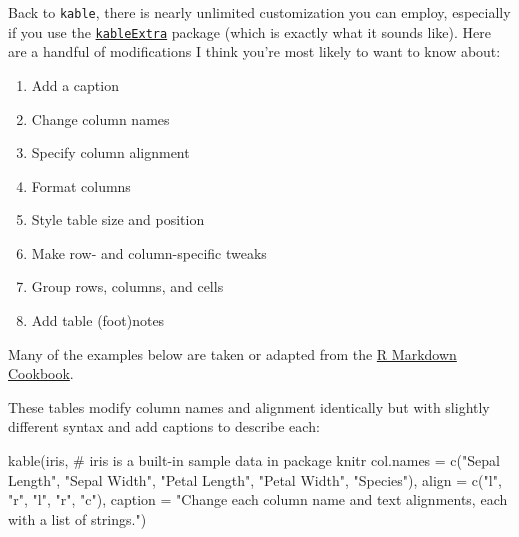 \documentclass[
  letterpaper,
  DIV=11,
  numbers=noendperiod]{scrartcl}
\newenvironment{Shaded}{\begin{snugshade}}{\end{snugshade}}
\newcommand{\AttributeTok}[1]{\textcolor[rgb]{0.40,0.45,0.13}{#1}}
\newcommand{\CommentTok}[1]{\textcolor[rgb]{0.37,0.37,0.37}{#1}}
\newcommand{\FunctionTok}[1]{\textcolor[rgb]{0.28,0.35,0.67}{#1}}
\newcommand{\NormalTok}[1]{\textcolor[rgb]{0.00,0.23,0.31}{#1}}
\newcommand{\StringTok}[1]{\textcolor[rgb]{0.13,0.47,0.30}{#1}}
\providecommand{\tightlist}{%
  \setlength{\itemsep}{0pt}\setlength{\parskip}{0pt}}\usepackage{longtable,booktabs,array}
\begin{document}
Back to \texttt{kable}, there is nearly unlimited customization you can
employ, especially if you use the
\href{https://haozhu233.github.io/kableExtra/}{\texttt{kableExtra}}
package (which is exactly what it sounds like). Here are a handful of
modifications I think you're most likely to want to know about:

\begin{enumerate}
\def\labelenumi{\arabic{enumi}.}
\tightlist
\item
  Add a caption
\item
  Change column names
\item
  Specify column alignment
\item
  Format columns
\item
  Style table size and position
\item
  Make row- and column-specific tweaks
\item
  Group rows, columns, and cells
\item
  Add table (foot)notes
\end{enumerate}

Many of the examples below are taken or adapted from the
\href{https://bookdown.org/yihui/rmarkdown-cookbook/tables.html}{R
Markdown Cookbook}.

These tables modify column names and alignment identically but with
slightly different syntax and add captions to describe each:

\begin{Shaded}
\begin{Highlighting}[]
\FunctionTok{kable}\NormalTok{(iris, }\CommentTok{\# iris is a built{-}in sample data in package knitr}
      \AttributeTok{col.names =} \FunctionTok{c}\NormalTok{(}\StringTok{"Sepal Length"}\NormalTok{, }\StringTok{"Sepal Width"}\NormalTok{,  }\StringTok{"Petal Length"}\NormalTok{, }\StringTok{"Petal Width"}\NormalTok{,  }\StringTok{"Species"}\NormalTok{), }
      \AttributeTok{align =} \FunctionTok{c}\NormalTok{(}\StringTok{"l"}\NormalTok{, }\StringTok{"r"}\NormalTok{, }\StringTok{"l"}\NormalTok{, }\StringTok{"r"}\NormalTok{, }\StringTok{"c"}\NormalTok{),}
      \AttributeTok{caption =} \StringTok{"Change each column name and text alignments, each with a list of strings."}\NormalTok{)}
\end{Highlighting}
\end{Shaded}
\end{document}
